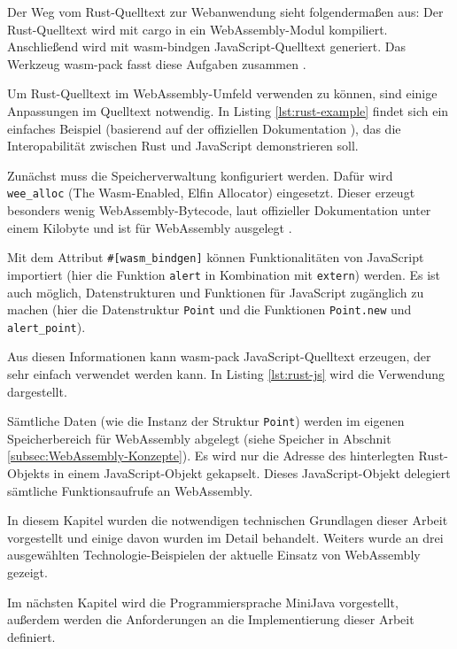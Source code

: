 Der Weg vom Rust-Quelltext zur Webanwendung sieht folgendermaßen aus: Der Rust-Quelltext wird mit cargo in ein WebAssembly-Modul kompiliert. Anschließend wird mit wasm-bindgen JavaScript-Quelltext generiert. Das Werkzeug wasm-pack fasst diese Aufgaben zusammen \cite{RustWasmBook}.

Um Rust-Quelltext im WebAssembly-Umfeld verwenden zu können, sind einige Anpassungen im Quelltext notwendig. In Listing \ref{lst:rust-example} findet sich ein einfaches Beispiel (basierend auf der offiziellen Dokumentation \cite{RustWasmBook}), das die Interopabilität zwischen Rust und JavaScript demonstrieren soll.



Zunächst muss die Speicherverwaltung konfiguriert werden. Dafür wird \lstinline{wee_alloc} (The Wasm-Enabled, Elfin Allocator) eingesetzt. Dieser erzeugt besonders wenig WebAs\-sembly-Bytecode, laut offizieller Dokumentation unter einem Kilobyte und ist für Web\-Assembly ausgelegt \cite{WeeAlloc}.

Mit dem Attribut \lstinline{#[wasm_bindgen]} können Funktionalitäten von JavaScript importiert (hier die Funktion \lstinline{alert} in Kombination mit \lstinline{extern}) werden. Es ist auch möglich, Datenstrukturen und Funktionen für JavaScript zugänglich zu machen (hier die Datenstruktur \lstinline{Point} und die Funktionen \lstinline{Point.new} und \lstinline{alert_point}).

Aus diesen Informationen kann wasm-pack JavaScript-Quelltext erzeugen, der sehr einfach verwendet werden kann. In Listing \ref{lst:rust-js} wird die Verwendung dargestellt. 



Sämtliche Daten (wie die Instanz der Struktur \lstinline{Point}) werden im eigenen Speicherbereich für WebAssembly abgelegt (siehe Speicher in Abschnit \ref{subsec:WebAssembly-Konzepte}). Es wird nur die Adresse des hinterlegten Rust-Objekts in einem JavaScript-Objekt gekapselt. Dieses JavaScript-Objekt delegiert sämtliche Funktionsaufrufe an WebAssembly.

\vspace{4em}
In diesem Kapitel wurden die notwendigen technischen Grundlagen dieser Arbeit vorgestellt und einige davon wurden im Detail behandelt. Weiters wurde an drei ausgewählten Technologie-Beispielen der aktuelle Einsatz von WebAssembly gezeigt.

Im nächsten Kapitel wird die Programmiersprache MiniJava vorgestellt, außerdem werden die Anforderungen an die Implementierung dieser Arbeit definiert.